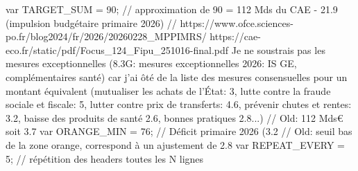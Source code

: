 

   var TARGET_SUM   = 90;   // approximation de 90 = 112 Mds du CAE - 21.9 (impulsion budgétaire primaire 2026) // https://www.ofce.sciences-po.fr/blog2024/fr/2026/20260228_MPPIMRS/ https://cae-eco.fr/static/pdf/Focus_124_Fipu_251016-final.pdf Je ne soustrais pas les mesures exceptionnelles (8.3G: mesures exceptionnelles 2026: IS GE, complémentaires santé) car j'ai ôté de la liste des mesures consensuelles pour un montant équivalent (mutualiser les achats de l'État: 3, lutte contre la fraude sociale et fiscale: 5, lutter contre prix de transferts: 4.6, prévenir chutes et rentes: 3.2, baisse des produits de santé 2.6, bonnes pratiques 2.8...)
	// Old: 112 Mds€ soit 3.7%
    var ORANGE_MIN   = 76;    // Déficit primaire 2026 (3.2%
	// Old: seuil bas de la zone orange, correspond à un ajustement de 2.8%
    var REPEAT_EVERY = 5;     // répétition des headers toutes les N lignes

